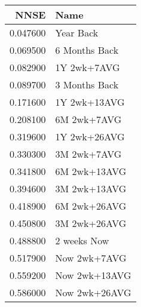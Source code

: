 \begin{tabular}{rl}
NNSE & Name \\
\hline
0.047600 & Year Back \\
0.069500 & 6 Months Back \\
0.082900 & 1Y 2wk+7AVG \\
0.089700 & 3 Months Back \\
0.171600 & 1Y 2wk+13AVG \\
0.208100 & 6M 2wk+7AVG \\
0.319600 & 1Y 2wk+26AVG \\
0.330300 & 3M 2wk+7AVG \\
0.341800 & 6M 2wk+13AVG \\
0.394600 & 3M 2wk+13AVG \\
0.418900 & 6M 2wk+26AVG \\
0.450800 & 3M 2wk+26AVG \\
0.488800 & 2 weeks Now \\
0.517900 & Now 2wk+7AVG \\
0.559200 & Now 2wk+13AVG \\
0.586000 & Now 2wk+26AVG \\
\hline
\end{tabular}